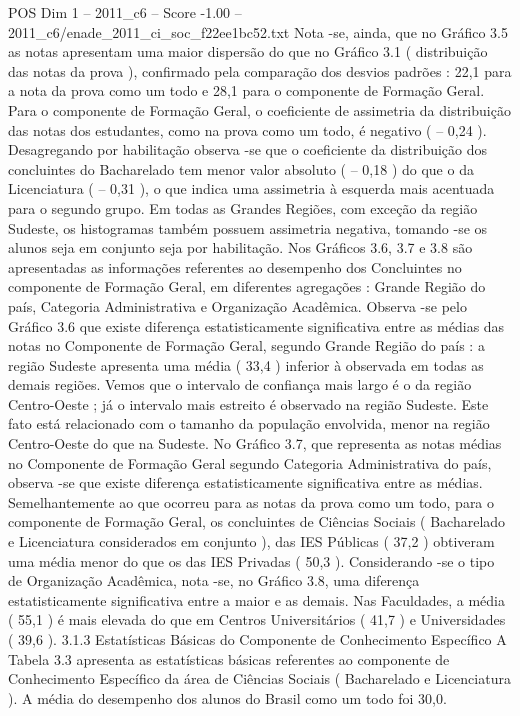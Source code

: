 \begin{textsample}{POS Dim 1 – 2011\_c6 – Score -1.00 – 2011\_c6/enade\_2011\_ci\_soc\_f22ee1bc52.txt}
Nota -se, ainda, que no Gráfico 3.5 as notas apresentam uma maior dispersão do que no Gráfico 3.1 ( distribuição das notas da prova ), confirmado pela comparação dos desvios padrões : 22,1 para a nota da prova como um todo e 28,1 para o componente de Formação Geral.
Para o componente de Formação Geral, o coeficiente de assimetria da distribuição das notas dos estudantes, como na prova como um todo, é negativo ( – 0,24 ).
Desagregando por habilitação observa -se que o coeficiente da distribuição dos concluintes do Bacharelado tem menor valor absoluto ( – 0,18 ) do que o da Licenciatura ( – 0,31 ), o que indica uma assimetria à esquerda mais acentuada para o segundo grupo.
Em todas as Grandes Regiões, com exceção da região Sudeste, os histogramas também possuem assimetria negativa, tomando -se os alunos seja em conjunto seja por habilitação.
Nos Gráficos 3.6, 3.7 e 3.8 são apresentadas as informações referentes ao desempenho dos Concluintes no componente de Formação Geral, em diferentes agregações : Grande Região do país, Categoria Administrativa e Organização Acadêmica.
Observa -se pelo Gráfico 3.6 que existe diferença estatisticamente significativa entre as médias das notas no Componente de Formação Geral, segundo Grande Região do país : a região Sudeste apresenta uma média ( 33,4 ) inferior à observada em todas as demais regiões.
Vemos que o intervalo de confiança mais largo é o da região Centro-Oeste ; já o intervalo mais estreito é observado na região Sudeste.
Este fato está relacionado com o tamanho da população envolvida, menor na região Centro-Oeste do que na Sudeste.
No Gráfico 3.7, que representa as notas médias no Componente de Formação Geral segundo Categoria Administrativa do país, observa -se que existe diferença estatisticamente significativa entre as médias.
Semelhantemente ao que ocorreu para as notas da prova como um todo, para o componente de Formação Geral, os concluintes de Ciências Sociais ( Bacharelado e Licenciatura considerados em conjunto ), das IES Públicas ( 37,2 ) obtiveram uma média menor do que os das IES Privadas ( 50,3 ).
Considerando -se o tipo de Organização Acadêmica, nota -se, no Gráfico 3.8, uma diferença estatisticamente significativa entre a maior e as demais.
Nas Faculdades, a média ( 55,1 ) é mais elevada do que em Centros Universitários ( 41,7 ) e Universidades ( 39,6 ). 3.1.3 Estatísticas Básicas do Componente de Conhecimento Específico A Tabela 3.3 apresenta as estatísticas básicas referentes ao componente de Conhecimento Específico da área de Ciências Sociais ( Bacharelado e Licenciatura ).
A média do desempenho dos alunos do Brasil como um todo foi 30,0.

\end{textsample}
